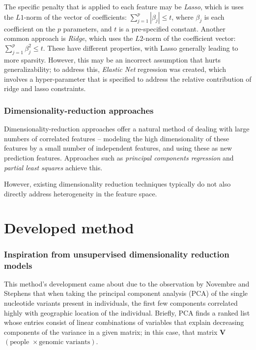 The specific penalty that is applied to each feature may be \textit{Lasso}, which is uses the $L1$-norm of the vector of coefficients: $\sum_{j=1}^p | \beta_j | \leq t$, where $\beta_j$ is each coefficient on the $p$ parameters, and $t$ is a pre-specified constant. Another common approach is \textit{Ridge}, which uses the $L2$-norm of the coefficient vector:  $\sum_{j=1}^p  \beta_j^2  \leq t$. These have different properties, with Lasso generally leading to more sparsity. However, this may be an incorrect assumption that hurts generalizability; to address this, \textit{Elastic Net} regression was created, which involves a hyper-parameter that is specified to address the relative contribution of ridge and lasso constraints. 


\subsubsection{Dimensionality-reduction approaches}

Dimensionality-reduction approaches offer a natural method of dealing with large numbers of correlated features -- modeling the high dimensionality of these features by a small number of independent features, and using these as new prediction features. Approaches such as \textit{principal components regression} and \textit{partial least squares} achieve this.

However, existing dimensionality reduction techniques typically do not also directly address heterogeneity in the feature space. 



\section{Developed method}
\subsubsection{Inspiration from unsupervised dimensionality reduction models}

This method’s development came about due to the observation by Novembre and Stephens\cite{novembre_interpreting_2008} that when taking the principal component analysis (PCA) of the single nucleotide variants present in individuals, the first few components correlated highly with geographic location of the individual. Briefly, PCA finds a ranked list whose entries consist of linear combinations of variables that explain decreasing components of the variance in a given matrix; in this case, that matrix $\mathbf{V}$ $(\text{people } \times \text{genomic\ variants})$.

